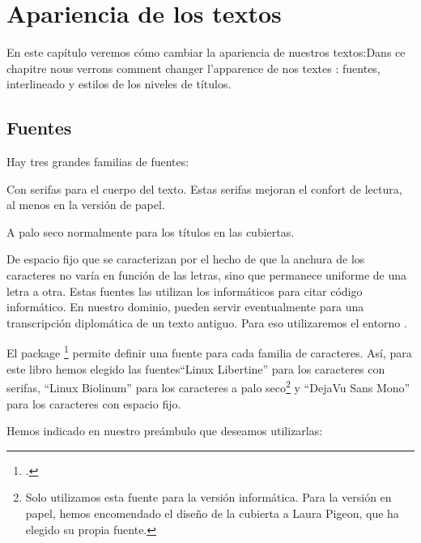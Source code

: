 \chapter{Apariencia de los textos}


\begin{intro}
En este capítulo veremos cómo cambiar la apariencia de nuestros textos:Dans ce chapitre nous verrons comment changer l'apparence de nos textes : fuentes, interlineado y estilos de los niveles de títulos.  
\end{intro}

\section{Fuentes}

Hay tres grandes familias de fuentes: 
\begin{glossaire}
\item[Con serifas]para el cuerpo del texto. Estas serifas mejoran el confort de lectura, al menos en la versión de papel. 
\item[A palo seco]normalmente para los títulos en las cubiertas.
\item[De espacio fijo]que se caracterizan por el hecho de que la anchura de los caracteres no varía en función de las letras, sino que permanece uniforme de una letra a otra. Estas fuentes las utilizan los informáticos para citar código informático. En nuestro dominio, pueden servir eventualmente para una transcripción diplomática de un texto antiguo. Para eso utilizaremos el entorno .
\end{glossaire}

El package \footcite{fontspec} permite definir una fuente para cada familia de caracteres. Así, para este libro hemos elegido las fuentes\enquote{Linux Libertine} para los caracteres con serifas, \enquote{Linux Biolinum} para los caracteres a palo seco\footnote{Solo utilizamos esta fuente para la versión informática. Para la versión en papel, hemos encomendado el diseño de la cubierta a Laura Pigeon, que ha elegido su propia fuente.} y \enquote{DejaVu  Sans Mono} para los caracteres con espacio fijo.

Hemos indicado en nuestro preámbulo que deseamos utilizarlas:

\begin{latexcode}
\setmainfont[Mapping=tex-text]{Linux Libertine}
\setsansfont[Mapping=tex-text]{Linux Biolinum}
\setmonofont[Scale=0.75]{DejaVu  Sans Mono}
\end{latexcode}

